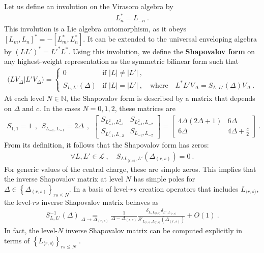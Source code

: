 \documentclass[12pt, a4paper]{article}
\newcommand{\myindex}[1]{\textbf{\boldmath #1}}
\begin{document}
Let us define an involution on the Virasoro algebra by 
\begin{align}
 L^*_n = L_{-n} \ . 
\end{align}
This involution is a Lie algebra automorphism, as it obeys $[L_m,L_n]^* = -[L_m^*,L_n^*]$. It can be extended to the universal enveloping algebra by $\left(LL'\right)^* = L'^*L^*$. Using this involution, we define the \myindex{Shapovalov form} on any highest-weight representation as the symmetric bilinear form such that 
\begin{align}
 \big(LV_\Delta\big| L'V_\Delta\big) = \left\{\begin{array}{ll} 0 & \text{if } |L|\neq |L'|\ , 
                                                \\
                                              S_{L,L'}(\Delta) & \text{if } |L|=|L'|\ , \quad \text{where} \quad L^*L'V_\Delta = S_{L,L'}(\Delta) V_\Delta\ .  
                                             \end{array}\right.
\label{shap}
\end{align}
At each level $N\in\mathbb{N}$, the Shapovalov form is described by a matrix that depends on $\Delta$ and $c$. In the cases $N=0,1,2$, these matrices are 
\begin{align}
 S_{1,1} = 1 \ \  , \ \   S_{L_{-1},L_{-1}} = 2\Delta \ \  , \ \  \begin{bmatrix} S_{L_{-1}^2,L_{-1}^2} & S_{L_{-1}^2,L_{-2}} \\ S_{L_{-1}^2,L_{-2}} & S_{L_{-2},L_{-2}}\end{bmatrix} = 
 \begin{bmatrix} 4\Delta(2\Delta+1) & 6\Delta \\ 6\Delta & 4\Delta+\frac{c}{2}\end{bmatrix}\ .
 \label{sh012}
\end{align}
From its definition, it follows that the Shapovalov form has zeros: 
\begin{align}
 \forall L, L'\in \mathcal{L}\ , \quad S_{LL_{\langle r,s\rangle},L'}(\Delta_{(r,s)})=0 \ . 
\end{align}
For generic values of the central charge, these are simple zeros. This implies that the inverse Shapovalov matrix at level $N$ has simple poles for $\Delta\in \left\{\Delta_{(r,s)}\right\}_{rs\leq N}$. In a basis of level-$rs$ creation operators that includes $L_{\langle r,s\rangle}$, the level-$rs$ inverse Shapovalov matrix behaves as 
\begin{align}
 S^{-1}_{L,L'}(\Delta) \underset{\Delta\to \Delta_{(r,s)}} = \frac{1}{\Delta-\Delta_{(r,s)}} \frac{\delta_{L,L_{\langle r,s\rangle}}\delta_{L',L_{\langle r,s\rangle}}}{S'_{L_{\langle r,s\rangle},L_{\langle r,s\rangle}}(\Delta_{(r,s)})}  + O(1) \ . 
 \label{smo}
\end{align}
In fact, the level-$N$ inverse Shapovalov matrix can be computed explicitly in terms of $\left\{L_{\langle r,s\rangle}\right\}_{rs\leq N}$ \cite{fqs24}.
\end{document}
